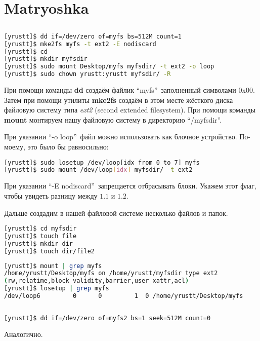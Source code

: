 \documentclass[12pt]{article}
\begin{document}
\section{Matryoshka}
\subsection{}
\begin{lstlisting}[language=bash, frame=single]
[yrustt]$ dd if=/dev/zero of=myfs bs=512M count=1
[yrustt]$ mke2fs myfs -t ext2 -E nodiscard
[yrustt]$ cd
[yrustt]$ mkdir myfsdir
[yrustt]$ sudo mount Desktop/myfs myfsdir/ -t ext2 -o loop
[yrustt]$ sudo chown yrustt:yrustt myfsdir/ -R
\end{lstlisting}
	
При помощи команды \textbf{dd} создаём файлик \textquotedblleft myfs\textquotedblright\ заполненный символами 0x00. Затем при помощи утилиты \textbf{mke2fs} создаём в этом месте жёсткого диска файловую систему типа \textit{ext2} (second extended filesystem). При помощи команды \textbf{mount} монтируем нашу файловую систему в директорию \textquotedblleft /myfsdir\textquotedblright. 
	
При указании \textquotedblleft -o loop\textquotedblright\ файл можно использовать как блочное устройство. По-моему, это было бы равносильно:
\begin{lstlisting}[language=bash, frame=single]
[yrustt]$ sudo losetup /dev/loop[idx from 0 to 7] myfs
[yrustt]$ sudo mount /dev/loop[idx] myfsdir/ -t ext2
\end{lstlisting}

При указании \textquotedblleft -E nodiscard\textquotedblright\ запрещается отбрасывать блоки. Укажем этот флаг, чтобы увидеть разницу между $1.1$ и $1.2$.

Дальше создадим в нашей файловой системе несколько файлов и папок.
\begin{lstlisting}[language=bash, frame=single]
[yrustt]$ cd myfsdir
[yrustt]$ touch file
[yrustt]$ mkdir dir
[yrustt]$ touch dir/file2
\end{lstlisting}
\begin{lstlisting}[language=bash, frame=single]
[yrustt]$ mount | grep myfs
/home/yrustt/Desktop/myfs on /home/yrustt/myfsdir type ext2 
(rw,relatime,block_validity,barrier,user_xattr,acl)
[yrustt]$ losetup | grep myfs
/dev/loop6         0      0         1  0 /home/yrustt/Desktop/myfs
\end{lstlisting}
\newpage
\subsection{}
\begin{lstlisting}[language=bash, frame=single]
[yrustt]$ dd if=/dev/zero of=myfs2 bs=1 seek=512M count=0
\end{lstlisting}
Аналогично.
\end{document}

